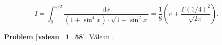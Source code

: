 %

\begin{problem_with_solution}
    \label{valean_1_58}%
    \begin{equation}
        I = \int_0^{\pi/2} \frac{\mathrm{d}x}{(1 + \sin^4 x) \cdot \sqrt{1 + \sin^2 x}} = \frac 1 8 \left(\pi + \frac{\Gamma(1/4)^2}{\sqrt{2 \pi}}\right).
    \end{equation}
\end{problem_with_solution}


\textbf{Problem \ref{valean_1_58}}.
Vălean \cite[s. 36, 263-267]{nahin15}.


%